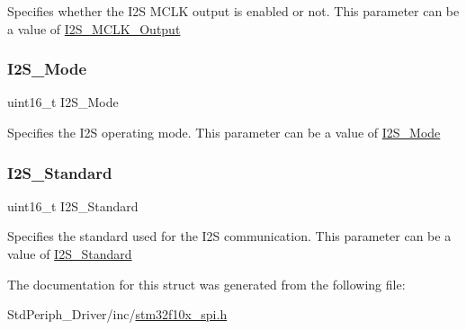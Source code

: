 Specifies whether the I2S M\+C\+LK output is enabled or not. This parameter can be a value of \mbox{\hyperlink{group___i2_s___m_c_l_k___output}{I2\+S\+\_\+\+M\+C\+L\+K\+\_\+\+Output}} \mbox{\label{struct_i2_s___init_type_def_ab239a97360862b2514410fef774686f5}} 
\subsubsection{\texorpdfstring{I2S\_Mode}{I2S\_Mode}}
{\footnotesize\ttfamily uint16\+\_\+t I2\+S\+\_\+\+Mode}

Specifies the I2S operating mode. This parameter can be a value of \mbox{\hyperlink{group___i2_s___mode}{I2\+S\+\_\+\+Mode}} \mbox{\label{struct_i2_s___init_type_def_a0f0c02142c68e2c2f0038ca79bdbd365}} 
\subsubsection{\texorpdfstring{I2S\_Standard}{I2S\_Standard}}
{\footnotesize\ttfamily uint16\+\_\+t I2\+S\+\_\+\+Standard}

Specifies the standard used for the I2S communication. This parameter can be a value of \mbox{\hyperlink{group___i2_s___standard}{I2\+S\+\_\+\+Standard}} 

The documentation for this struct was generated from the following file\+:\begin{DoxyCompactItemize}
\item 
Std\+Periph\+\_\+\+Driver/inc/\mbox{\hyperlink{stm32f10x__spi_8h}{stm32f10x\+\_\+spi.\+h}}\end{DoxyCompactItemize}
